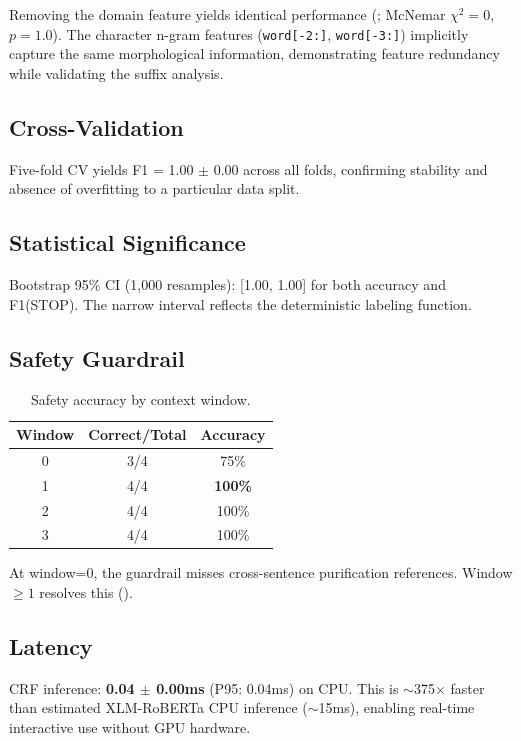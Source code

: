 \documentclass[11pt,a4paper]{article}
\begin{document}
Removing the domain feature yields identical performance (; McNemar $\chi^2=0$, $p=1.0$). The character n-gram features (\texttt{word[-2:]}, \texttt{word[-3:]}) implicitly capture the same morphological information, demonstrating feature redundancy while validating the suffix analysis.

\subsection{Cross-Validation}

Five-fold CV yields F1 = 1.00 $\pm$ 0.00 across all folds, confirming stability and absence of overfitting to a particular data split.

\subsection{Statistical Significance}

Bootstrap 95\% CI (1,000 resamples): [1.00, 1.00] for both accuracy and F1(STOP). The narrow interval reflects the deterministic labeling function.

\subsection{Safety Guardrail}

\begin{table}[t]
\small
\centering
\caption{Safety accuracy by context window.}
\label{tab:safety}
\begin{tabular}{ccc}
\toprule
\textbf{Window} & \textbf{Correct/Total} & \textbf{Accuracy} \\
\midrule
0 & 3/4 & 75\% \\
1 & 4/4 & \textbf{100\%} \\
2 & 4/4 & 100\% \\
3 & 4/4 & 100\% \\
\bottomrule
\end{tabular}
\end{table}

At window=0, the guardrail misses cross-sentence purification references. Window $\geq 1$ resolves this ().

\subsection{Latency}

CRF inference: \textbf{0.04 $\pm$ 0.00ms} (P95: 0.04ms) on CPU. This is $\sim$375$\times$ faster than estimated XLM-RoBERTa CPU inference ($\sim$15ms), enabling real-time interactive use without GPU hardware.
\end{document}
